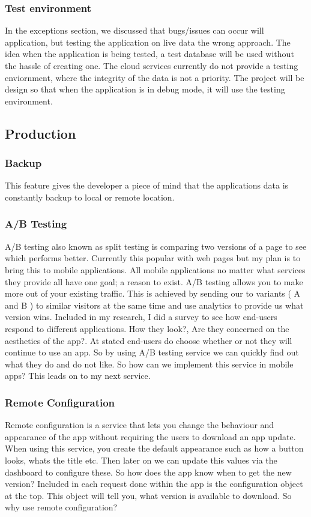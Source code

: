 \subsubsection{Test environment}

In the exceptions section, we discussed that bugs/issues can occur will application, but testing the application on live data the wrong approach. The idea when the application is being tested, a test database will be used without the hassle of creating one. The cloud services currently do not provide a testing enviornment, where the integrity of the data is not a priority. The project will be design so that when the application is in debug mode, it will use the testing environment. 

\subsection{Production}

\subsubsection{Backup}
This feature gives the developer a piece of mind that the applications data is constantly backup to local or remote location.

\subsubsection{A/B Testing}
A/B testing also known as split testing is comparing two versions of a page to see which performs better. Currently this popular with web pages but my plan is to bring this to mobile applications. All mobile applications no matter what services they provide all have one goal; a reason to exist. A/B testing allows you to make more out of your existing traffic. This is achieved by sending our to variants ( A and B ) to similar visitors at the same time and use analytics to provide us what version wins. Included in my research, I did a survey to see how end-users respond to different applications. How they look?, Are they concerned on the aesthetics of the app?. At stated end-users do choose whether or not they will continue to use an app. So by using A/B testing service we can quickly find out what they do and do not like. So how can we implement this service in mobile apps? This leads on to my next service.

\subsubsection{Remote Configuration}
Remote configuration is a service that lets you change the behaviour and appearance of the app without requiring the users to download an app update. When using this service, you create the default appearance such as how a button looks, whats the title etc. Then later on we can update this values via the dashboard to configure these. So how does the app know when to get the new version? Included in each request done within the app is the configuration object at the top. This object will tell you, what version is available to download. So why use remote configuration? 

